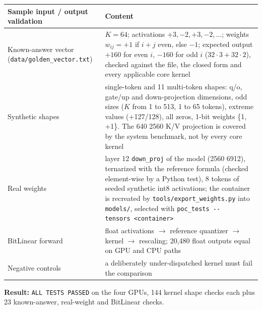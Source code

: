 \documentclass[
  10pt,
]{article}
\newcounter{none} %
\begin{document}
{\def\LTcaptype{none} %
\begin{longtable}[]{@{}
  >{\raggedright\arraybackslash}p{}
  >{\raggedright\arraybackslash}p{}@{}}
\toprule\noalign{}
\begin{minipage}[b]{\linewidth}\raggedright%
Sample input / output validation
\end{minipage} & \begin{minipage}[b]{\linewidth}\raggedright%
Content
\end{minipage} \\
\midrule\noalign{}
\endhead%
\bottomrule\noalign{}
\endlastfoot%
Known-answer vector (\texttt{data/golden\_vector.txt}) & \(K = 64\);
activations \(+3, -2, +3, -2, \dots\); weights \(w_{ij} = +1\) if
\(i + j\) even, else \(-1\); expected output \(+160\) for even \(i\),
\(-160\) for odd \(i\) (\(32 \cdot3 + 32 \cdot2\)), checked against
the file, the closed form and every applicable core kernel \\
Synthetic shapes & 9 single-token and 11 multi-token shapes: q/o, gate/up
and down-projection dimensions, odd sizes (\(K\) from 1 to 513, 1 to 65
tokens), extreme values (+127/\textminus{}128), all zeros, 1-bit weights
\{\textminus{}1, +1\}. The 640 \texttimes{} 2560 K/V projection is covered
by the system benchmark, not by every core kernel \\
Real weights & layer 12 \texttt{down\_proj} of the model (2560 \texttimes{} 6912),
ternarized with the reference formula (checked element-wise by a Python
test), 8 tokens of seeded synthetic int8 activations; the container is
recreated by
\texttt{tools/export\_weights.py} into \texttt{models/}, selected with
\texttt{poc\_tests\ -{}-tensors\ \textless{}container\textgreater{}} \\
BitLinear forward & float activations $\rightarrow$ reference quantizer $\rightarrow$ kernel $\rightarrow$
rescaling; 20,480 float outputs equal on GPU and CPU paths \\
Negative controls & a deliberately under-dispatched kernel must fail the
comparison \\
\end{longtable}
}

\textbf{Result:} \texttt{ALL\ TESTS\ PASSED} on the four GPUs, 144
kernel \texttimes{} shape checks each plus 23 known-answer, real-weight
and BitLinear checks.
\end{document}
